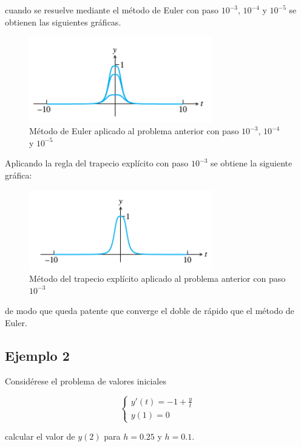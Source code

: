 \documentclass{article}
\theoremstyle{theorem-style}  %
\theoremstyle{definition-style}
\theoremstyle{example-style}
\begin{document}
cuando se resuelve mediante el método de Euler con paso $10^{-3}$, $10^{-4}$ y  $10^{-5}$ se obtienen las siguientes gráficas. 

		\begin{figure}[H]
			\centering
			\includegraphics[width=8cm]{./Images/ej1-1.png}
			\caption{Método de Euler aplicado al problema anterior con paso $10^{-3}$, $10^{-4}$ y  $10^{-5}$} 
			\label{fig:ej1-1}
		\end{figure}
		
		Aplicando la regla del trapecio explícito con paso $10^{-3}$ se obtiene la siguiente gráfica:
		
		\begin{figure}[H]
			\centering
			\includegraphics[width=8cm]{./Images/ej1-2.png}
			\caption{Método del trapecio explícito aplicado al problema anterior con paso $10^{-3}$} 
			\label{fig:ej1-2}
		\end{figure}
		
		de modo que queda patente que converge el doble de rápido que el método de Euler. 
		
\subsection{Ejemplo 2}

Considérese el problema de valores iniciales

		\begin{equation*}
			\begin{cases}
			y'(t) = -1 + \frac{y}{t} \\
			y(1) = 0 
			\end{cases}
		\end{equation*}
		
calcular el valor de $y(2)$ para $h=0.25$ y $h=0.1$.
	
\end{document}
